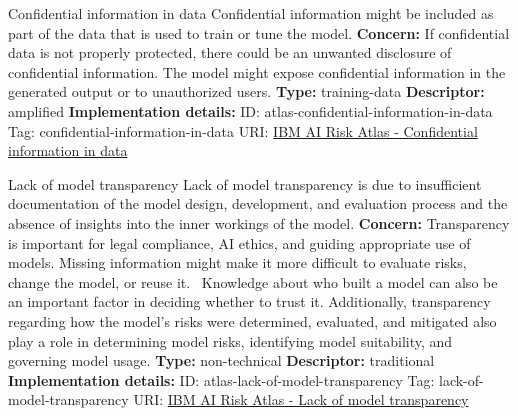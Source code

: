 \documentclass[a4paper,12pt]{article}
\begin{document}
\begin{definitionbox}{Confidential information in data}
Confidential information might be included as part of the data that is used to train or tune the model.\newline\newline
\textbf{Concern: }If confidential data is not properly protected, there could be an unwanted disclosure of confidential information. The model might expose confidential information in the generated output or to unauthorized users.\newline\newline
\textbf{Type: }training-data\newline
\textbf{Descriptor: }amplified \newline\newline
\textbf{Implementation details: } \newline
ID: atlas-confidential-information-in-data \newline
Tag: confidential-information-in-data \newline
URI:  \href{https://www.ibm.com/docs/en/watsonx/saas?topic=SSYOK8/wsj/ai-risk-atlas/confidential-information-in-data.html}{IBM AI Risk Atlas - Confidential information in data}\newline
\end{definitionbox}
\begin{definitionbox}{Lack of model transparency}
Lack of model transparency is due to insufficient documentation of the model design, development, and evaluation process and the absence of insights into the inner workings of the model.\newline\newline
\textbf{Concern: }Transparency is important for legal compliance, AI ethics, and guiding appropriate use of models. Missing information might make it more difficult to evaluate risks,  change the model, or reuse it.  Knowledge about who built a model can also be an important factor in deciding whether to trust it. Additionally, transparency regarding how the model's risks were determined, evaluated, and mitigated also play a role in determining model risks, identifying model suitability, and governing model usage.\newline\newline
\textbf{Type: }non-technical\newline
\textbf{Descriptor: }traditional \newline\newline
\textbf{Implementation details: } \newline
ID: atlas-lack-of-model-transparency \newline
Tag: lack-of-model-transparency \newline
URI:  \href{https://www.ibm.com/docs/en/watsonx/saas?topic=SSYOK8/wsj/ai-risk-atlas/lack-of-model-transparency.html}{IBM AI Risk Atlas - Lack of model transparency}\newline
\end{definitionbox}
\end{document}
